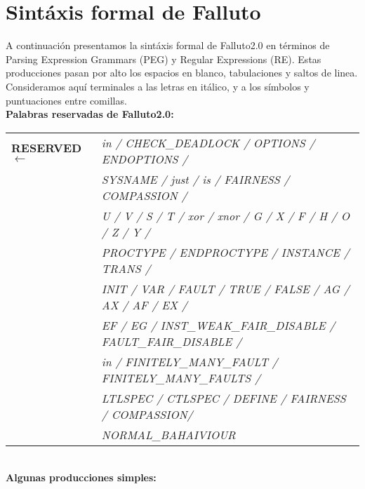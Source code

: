 \documentclass[titlepage, 12pt]{book}
\begin{document}


\chapter{Sint\'axis formal de Falluto}
\label{sintaxisFormal}

A continuaci\'on presentamos la sint\'axis formal de Falluto2.0 en t\'erminos de Parsing Expression Grammars (PEG) y Regular Expressions (RE). Estas producciones pasan por alto los espacios en blanco, tabulaciones y saltos de linea. Consideramos aqu\'i terminales a las letras en it\'alico, y a los s\'imbolos y puntuaciones entre comillas.\\

\textbf{Palabras reservadas de Falluto2.0:}\\



\begin{tabular}{>{\bfseries}l>{\itshape}l}
RESERVED $\longleftarrow$ & in / CHECK\_DEADLOCK / OPTIONS / ENDOPTIONS / \\
		  				  & SYSNAME / just / is / FAIRNESS / COMPASSION / \\
						  &	U / V / S / T / xor / xnor / G / X / F / H / O / Z / Y /\\
						  &	PROCTYPE / ENDPROCTYPE / INSTANCE / TRANS /\\
				          &	INIT / VAR / FAULT / TRUE / FALSE / AG / AX / AF / EX /\\
						  &	EF / EG / INST\_WEAK\_FAIR\_DISABLE / FAULT\_FAIR\_DISABLE /\\
					  	  &	in / FINITELY\_MANY\_FAULT / FINITELY\_MANY\_FAULTS /\\
   				          &	LTLSPEC / CTLSPEC / DEFINE / FAIRNESS / COMPASSION/\\
   				          & NORMAL\_BAHAIVIOUR\\
\end{tabular}
~\\




\textbf{Algunas producciones simples:}\\
\end{document}
